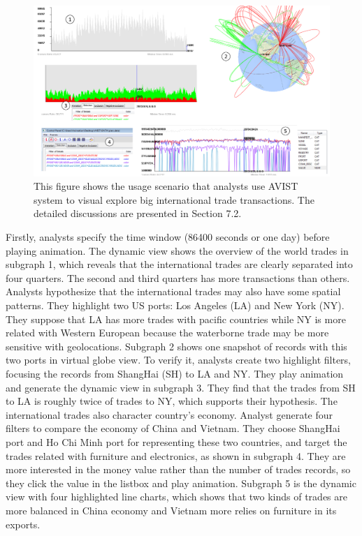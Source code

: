 \documentclass[journal]{vgtc}                %
\begin{document}
{\begin{figure}[htb]
	\centering
	\includegraphics[width=1.0\linewidth]{pic/worldtrade2.png}
	\parbox[t]{1.0\columnwidth}{\relax
	}
	\caption{\label{fig:network}
		This figure shows the usage scenario that analysts use AVIST system to visual explore big international trade transactions. The detailed discussions are presented in Section 7.2.}
\end{figure}

Firstly, analysts specify the time window (86400 seconds or one day) before playing animation. The dynamic view shows the overview of the world trades in subgraph 1, which reveals that the international trades are clearly separated into four quarters. The second and third quarters has more transactions than others. Analysts hypothesize that the international trades may also have some spatial patterns. They highlight two US ports: Los Angeles (LA) and New York (NY). They suppose that LA has more trades with pacific countries while NY is more related with Western European because the waterborne trade may be more sensitive with geolocations. Subgraph 2 shows one snapshot of records with this two ports in virtual globe view. To verify it, analysts create two highlight filters, focusing the records from ShangHai (SH) to LA and NY. They play animation and generate the dynamic view in subgraph 3. They find that the trades from SH to LA is roughly twice of trades to NY, which supports  their hypothesis. The international trades also character country's economy. Analyst generate four filters to compare the economy of China and Vietnam. They choose ShangHai port and Ho Chi Minh port for representing these two countries, and target the trades related with furniture and electronics, as shown in subgraph 4. They are more interested in the money value rather than the number of trades records, so they click the value in the listbox and play animation. Subgraph 5 is the dynamic view with four highlighted line charts, which shows that two kinds of trades are more balanced in China economy and Vietnam more relies on furniture in its exports. 

}
\end{document}
